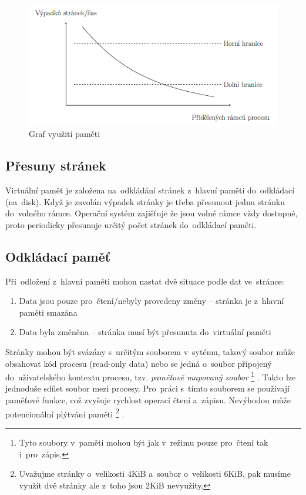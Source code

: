 \begin{figure}[ht]
	\centering
	\includegraphics[scale=1]{images/mem_freq_page.png}
	\caption{Graf využití paměti}
	\label{mem_freq_page}
\end{figure}

\subsection{Přesuny stránek}

Virtuální paměť je založena na~odkládání stránek z~hlavní paměti do~odkládací (na~disk). Když je zavolán výpadek stránky je třeba přesunout jednu stránku do~volného rámce. Operační systém zajišťuje že jsou volné rámce vždy dostupné, proto periodicky přesunuje určitý počet stránek do~odkládací paměti.

\subsection{Odkládací paměť}

Při~odložení z~hlavní paměti mohou nastat dvě situace podle dat ve~stránce:

\begin{enumerate}
	\item Data jsou pouze pro~čtení/nebyly provedeny změny -- stránka je z~hlavní paměti smazána
	\item Data byla změněna -- stránka musí být přesunuta do~virtuální paměti
\end{enumerate}

Stránky mohou být svázány s~určitým souborem v~sytému, takový soubor může obsahovat kód procesu (read-only data) nebo se jedná o~soubor připojený do~uživatelského kontextu procesu, tzv. \emph{paměťově mapovaný soubor}%
\footnote{Tyto soubory v~paměti mohou být jak v~režimu pouze pro~čtení tak i~pro~zápis.}%
. Takto lze jednoduše sdílet soubor mezi procesy. Pro~práci s~tímto souborem se používají paměťové funkce, což zvyšuje rychlost operací čtení a~zápisu. Nevýhodou může potencionální plýtvání paměti%
\footnote{Uvažujme stránky o~velikosti 4KiB a~soubor o~velikosti 6KiB, pak musíme využít dvě stránky ale z~toho jsou 2KiB nevyužity.}%
.

